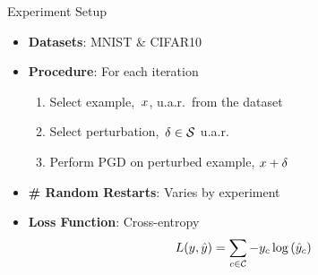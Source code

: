 \begin{frame}{Experiment Setup}
  \begin{itemize}
    \setlength{\itemsep}{10pt}
    \item \textbf{Datasets}: MNIST \& CIFAR10

    \item \textbf{Procedure}: For each iteration
      \begin{enumerate}[<+->]
        \setlength\itemsep{6pt}
        \item Select example,~$x$, u.a.r.\ from the dataset
        \item Select perturbation,~${\delta \in \mathcal{S}}$ u.a.r.
        \item Perform PGD on perturbed example, ${x + \delta}$
      \end{enumerate}

    \item \textbf{\# Random Restarts}: Varies by experiment

    \item \textbf{Loss Function}: Cross-entropy
      \begin{equation}\label{eq:CrossEntropy}
        L(y,\hat{y}) = \sum_{c \in \mathcal{C}} -y_c \log \left( \hat{y}_{c} \right)
      \end{equation}
  \end{itemize}
\end{frame}


